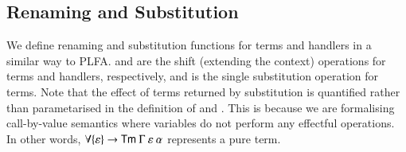 \documentclass[a4paper,11pt]{article}
\newcommand\fun[1]{{\AgdaFunction{#1}}}
\newcommand\data[1]{{\AgdaFunction{#1}}}
\begin{document}
\subsection{Renaming and Substitution}

We define renaming and substitution functions for terms and handlers in a similar way to PLFA.
\fun{↑\_} and \fun{↑H\_} are the shift (extending the context) operations for terms and handlers, respectively, and \fun{\_[\_]} is the single substitution operation for terms.
Note that the effect of terms returned by substitution is quantified rather than parametarised in the definition of \fun{Sub} and \fun{\_[\_]}.
This is because we are formalising call-by-value semantics where variables do not perform any effectful operations.
In other words, $\forall \{\varepsilon\} \rightarrow \data{Tm}\ \Gamma\ \varepsilon\ \alpha$ represents a pure term.
\begin{code}%
%
\>[2]\AgdaSpace{}%
\AgdaSymbol{:}\AgdaSpace{}%
\AgdaSpace{}%
\AgdaSpace{}%
\AgdaSpace{}%
\AgdaSpace{}%
\<%
\\
%
\>[2]\AgdaSpace{}%
\AgdaSpace{}%
\AgdaSpace{}%
\AgdaSymbol{=}\AgdaSpace{}%
\AgdaSpace{}%
\AgdaSymbol{\{}\AgdaSymbol{\}}\AgdaSpace{}%
\AgdaSpace{}%
\AgdaSpace{}%
\AgdaSpace{}%
\AgdaSpace{}%
\AgdaSpace{}%
\AgdaSpace{}%
\AgdaSpace{}%
\<%
\end{code}
\end{document}
